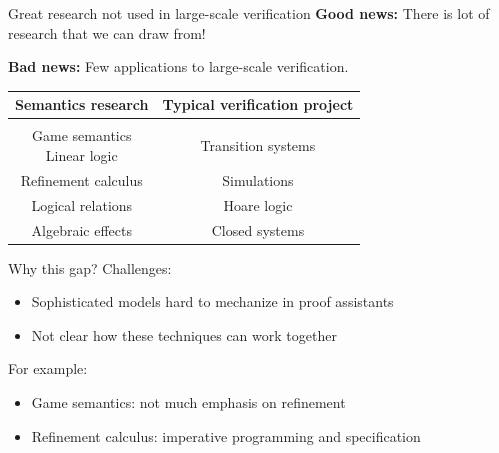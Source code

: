 \documentclass[aspectratio=54]{beamer}
\begin{document}
\begin{frame}{Great research not used in large-scale verification} %
  \textbf{Good news:}
  There is lot of research that we can draw from!

  \textbf{Bad news:}
  Few applications to
  large-scale verification.

  \vfill
  \begin{center}
    \begin{tabular}{cc}
      \hline
      Semantics research &
      Typical verification project
      \\
      \hline
      \\[-1ex]
      \parbox{10em}{\centering Game semantics \\ Linear logic} &
      Transition systems \\[1em]
      Refinement calculus &
      Simulations \\[1em]
      Logical relations &
      Hoare logic \\[1em]
      Algebraic effects &
      Closed systems \\[1em]
      \hline
    \end{tabular}
  \end{center}
\end{frame}

\begin{frame}{Why this gap?} %
  Challenges:
  \begin{itemize}
    \item Sophisticated models hard to mechanize in proof assistants
    \item Not clear how these techniques can work together
  \end{itemize}

  For example:
  \begin{itemize}
    \item Game semantics: not much emphasis on refinement
    \item Refinement calculus: imperative programming and specification
  \end{itemize}
\end{frame}  
\end{document}
